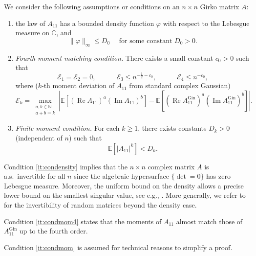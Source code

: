 \documentclass[10pt,reqno]{amsart}
\renewcommand{\Re}{\operatorname{Re}}
\renewcommand{\Im}{\operatorname{Im}}
\newcommand{\N}{{\mathbb{N}}}
\newcommand{\eg}{e.g., }
\newcommand{\<}{\langle}
\renewcommand{\>}{\rangle}
\newcommand{\AG}{A^{\mathrm{Gin}}}
\numberwithin{equation}{section}
\begin{document}
\smallskip
We consider the following assumptions or conditions on an $n\times n$ Girko matrix $A$: 
\begin{enumerate}[label=(C\arabic*)]
\item\label{it:condensity} the law of $A_{11}$ has a bounded density function $\varphi$ with respect to the Lebesgue measure on $\mathbb{C}$, and
\begin{equation*}
\|\varphi\|_\infty\leq D_0\quad\text{ for some constant $D_0>0$.}
\end{equation*}
\item\label{it:condmom4} \emph{Fourth moment matching condition.}
There exists a small constant $c_0>0$ such that
\begin{equation*}
\mathcal{E}_1=\mathcal{E}_2=0, \quad \qquad \mathcal{E}_3 \leq n^{-\frac{1}{2}-c_0}, \quad\qquad \mathcal{E}_4 \leq  n^{-c_0},
\end{equation*}
where ($k$-th moment deviation of $A_{11}$ from standard complex Gaussian)
\begin{equation*}
\mathcal{E}_k=\max_{\substack{a,b\in\N\\a+b=k}} \left|\mathbb{E}[(\Re A_{11})^a(\Im A_{11})^b]-\mathbb{E}[(\Re \AG_{11})^a(\Im \AG_{11})^b]\right|.
\end{equation*}

\item\label{it:condmom} \emph{Finite moment condition.} 
For each $k\geq 1$, there exists constants $D_k>0$ (independent of $n$) such that
\begin{equation*}
\mathbb{E}[|A_{11}|^k] < D_k.
\end{equation*}

\end{enumerate}

 Condition \ref{it:condensity} implies that the $n\times n$ complex matrix $A$ is a.s.\ invertible for all $n$ since the algebraic hypersurface $\{\det=0\}$ has zero Lebesgue measure. Moreover, the uniform bound on the density allows a precise  lower bound on the smallest singular value, see \eg \cite{Davies}. More generally, we refer to \cite{MR4680362} for the invertibility of random matrices beyond the density case.



Condition \ref{it:condmom4} states that the moments of $A_{11}$ almost match those of $\AG_{11}$ up to the fourth order.

Condition \ref{it:condmom} is assumed for technical reasons to simplify a proof.
\end{document}
